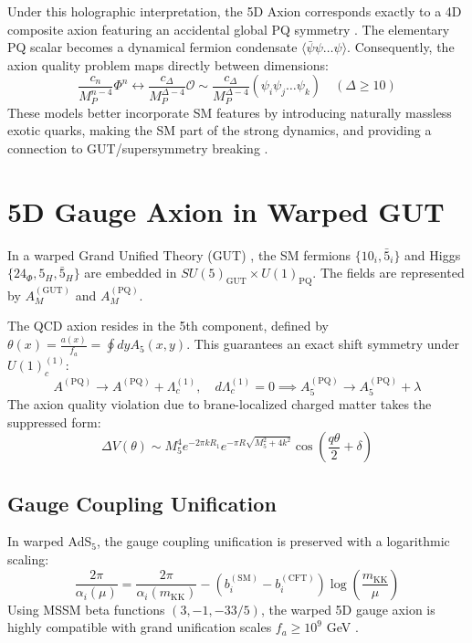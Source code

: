 \documentclass[11pt]{article}
\begin{document}
Under this holographic interpretation, the 5D Axion corresponds exactly to a 4D composite axion featuring an accidental global PQ symmetry \cite{kim1985, choikim1985}. The elementary PQ scalar becomes a dynamical fermion condensate $\langle \bar{\psi}\psi\dots\psi \rangle$. Consequently, the axion quality problem maps directly between dimensions:
\begin{equation}
    \frac{c_n}{M_P^{n-4}} \Phi^n \leftrightarrow \frac{c_\Delta}{M_P^{\Delta-4}} \mathcal{O} \sim \frac{c_\Delta}{M_P^{\Delta-4}} (\psi_i \psi_j \dots \psi_k) \quad (\Delta \ge 10)
\end{equation}
These models better incorporate SM features by introducing naturally massless exotic quarks, making the SM part of the strong dynamics, and providing a connection to GUT/supersymmetry breaking \cite{gherghetta2025_08888, sato2025, gherghetta2025_21813}.

\section{5D Gauge Axion in Warped GUT}
In a warped Grand Unified Theory (GUT) \cite{choi2025_15666}, the SM fermions $\{10_i, \bar{5}_i\}$ and Higgs $\{24_\Phi, 5_H, \bar{5}_H\}$ are embedded in $SU(5)_{\text{GUT}} \times U(1)_{\text{PQ}}$. The fields are represented by $A_M^{(\text{GUT})}$ and $A_M^{(\text{PQ})}$.

The QCD axion resides in the 5th component, defined by $\theta(x) = \frac{a(x)}{f_a} = \oint dy A_5(x,y)$. This guarantees an exact shift symmetry under $U(1)_c^{(1)}$:
\begin{equation}
    A^{(\text{PQ})} \to A^{(\text{PQ})} + \Lambda_c^{(1)}, \quad d\Lambda_c^{(1)} = 0 \implies A_5^{(\text{PQ})} \to A_5^{(\text{PQ})} + \lambda
\end{equation}
The axion quality violation due to brane-localized charged matter takes the suppressed form:
\begin{equation}
    \Delta V(\theta) \sim M_5^4 e^{-2\pi k R_1} e^{-\pi R \sqrt{M_5^2 + 4k^2}} \cos\left(\frac{q\theta}{2} + \delta\right)
\end{equation}

\subsection{Gauge Coupling Unification}
In warped AdS$_5$, the gauge coupling unification is preserved with a logarithmic scaling:
\begin{equation}
    \frac{2\pi}{\alpha_i(\mu)} = \frac{2\pi}{\alpha_i(m_{\text{KK}})} - (b_i^{(\text{SM})} - b_i^{(\text{CFT})}) \log\left(\frac{m_{\text{KK}}}{\mu}\right)
\end{equation}
Using MSSM beta functions $(3, -1, -33/5)$, the warped 5D gauge axion is highly compatible with grand unification scales $f_a \ge 10^9$ GeV \cite{benabou2025}.
\end{document}
